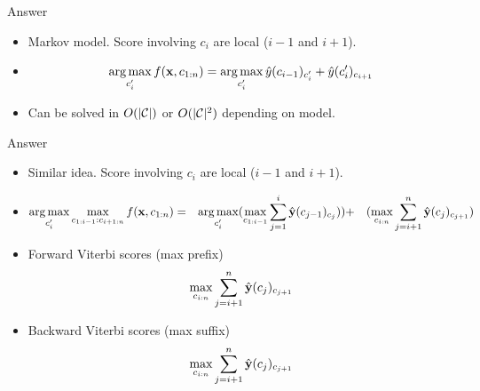 \documentclass{beamer}
\def\Lattice{
    \matrix (network)
    [matrix of nodes,
    nodes in empty cells,
    ampersand replacement=\&,
    column sep={1cm},
    row sep={0.1cm},
    nodes={outer sep=0pt,circle,minimum size=0.5cm, minimum width=1.3cm,draw, rectangle} ]
    {
     O \& O \& O \& O \& O\\
     I-PER \& I-PER \& I-PER \& I-PER \& I-PER \\ 
     I-ORG \& I-ORG \& I-ORG \& I-ORG \& I-ORG \\ 
     I-LOC \& I-LOC \& I-LOC \& I-LOC \& I-LOC \\ 
     |[draw=none]| \\
     |[draw=none]| Mayor \& |[draw=none]| DeBlasio \& |[draw=none]| from \& |[draw=none]| New  \& |[draw=none]| York  \\  
};
}
\begin{document}
\begin{frame}{Answer}
  \begin{itemize}
  \item Markov model. Score involving $c_i$ are local ($i-1$ and $i+1$).
    \air 

  \item   \[ \argmax_{c'_i} f(\boldx, c_{1:n})  = \argmax_{c'_i} \hat{y}(c_{i-1})_{c'_i} + \hat{y}(c'_{i})_{c_{i+1}} \] 
    \air 

  \item Can be solved in $O(|\mathcal{C}|)$ or $O(|\mathcal{C}|^2)$ depending on model.
  \end{itemize}
\end{frame}



\begin{frame}{Answer}
  \begin{itemize}
  \item Similar idea. Score involving $c_i$ are local ($i-1$ and $i+1$).
    \air 

  \item   
    \begin{eqnarray*}
      \argmax_{c'_i} \max_{c_{1:i-1}:c_{i+1:n}} f(\boldx, c_{1:n})  &=& \argmax_{c'_i} (\max_{c_{1:i-1}} \sum_{j=1}^i \hat{\boldy}(c_{j-1})_{c_{j}} ))  
      &+& (\max_{c_{i:n}} \sum_{j=i+1}^n \hat{\boldy}(c_{j})_{c_{j+1}} ) \\      
    \end{eqnarray*}

    \air 

  \item  Forward Viterbi scores (max prefix)
    \[ \max_{c_{i:n}} \sum_{j=i+1}^n \hat{\mathbf{y}}(c_{j})_{c_{j+1}} \]

    \air
  \item  Backward Viterbi scores (max suffix)
   \[ \max_{c_{i:n}} \sum_{j=i+1}^n \hat{\mathbf{y}}(c_{j})_{c_{j+1}} \]
  \end{itemize}
\end{frame}
\end{document}
